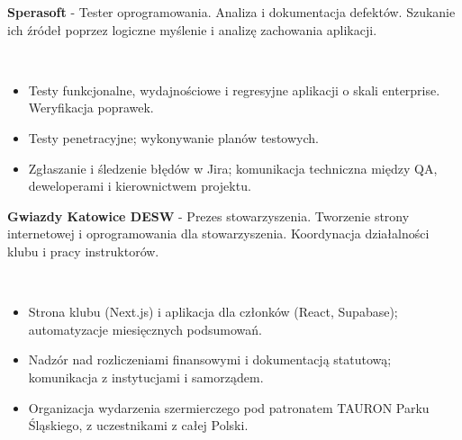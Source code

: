 \documentclass[11pt,a4paper]{awesome-cv}
\renewcommand{\acvSectionContentTopSkip}{1.6mm}
\renewenvironment{cvparagraph}{%
  \vspace{\acvSectionContentTopSkip}\vspace{-1mm}
  \paragraphstyle
}{\par\vspace{2mm}}
\begin{document}
\begin{cvparagraph}
\noindent\begin{minipage}[t]{\dimexpr\linewidth-4.8cm\relax}\vspace{0pt}
\textbf{Sperasoft} - Tester oprogramowania. Analiza i dokumentacja defektów. Szukanie ich źródeł poprzez logiczne myślenie i analizę zachowania aplikacji.
\end{minipage}\hfill
\begin{minipage}[t]{4.5cm}\vspace{0pt}
\raggedleft{}\\
\end{minipage}
\begin{itemize}[leftmargin=2ex,nosep,topsep=1mm,label=\textbullet]
  \item Testy funkcjonalne, wydajnościowe i regresyjne aplikacji o skali enterprise. Weryfikacja poprawek.
  \item Testy penetracyjne; wykonywanie planów testowych.
  \item Zgłaszanie i śledzenie błędów w Jira; komunikacja techniczna między QA, deweloperami i kierownictwem projektu.
\end{itemize}
\vspace{2mm}
\noindent\begin{minipage}[t]{\dimexpr\linewidth-4.8cm\relax}\vspace{0pt}
\textbf{Gwiazdy Katowice DESW} - Prezes stowarzyszenia. Tworzenie strony internetowej i oprogramowania dla stowarzyszenia. Koordynacja działalności klubu i pracy instruktorów.
\end{minipage}\hfill
\begin{minipage}[t]{4.5cm}\vspace{0pt}
\raggedleft{}\\
\end{minipage}
\begin{itemize}[leftmargin=2ex,nosep,topsep=1mm,label=\textbullet]
  \item Strona klubu (Next.js) i aplikacja dla członków (React, Supabase); automatyzacje miesięcznych podsumowań.
  \item Nadzór nad rozliczeniami finansowymi i dokumentacją statutową; komunikacja z instytucjami i samorządem.
  \item Organizacja wydarzenia szermierczego pod patronatem TAURON Parku Śląskiego, z uczestnikami z całej Polski.
\end{itemize}
\end{cvparagraph}
\end{document}
